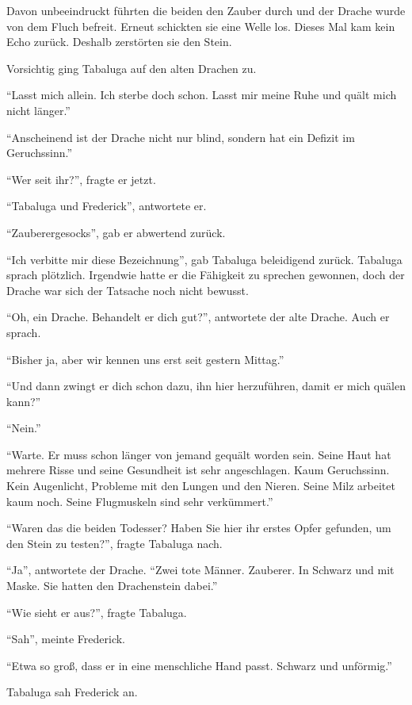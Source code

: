 Davon unbeeindruckt führten die beiden den Zauber durch und der Drache wurde von dem Fluch befreit. Erneut schickten sie eine Welle los. Dieses Mal kam kein Echo zurück. Deshalb zerstörten sie den Stein.

Vorsichtig ging Tabaluga auf den alten Drachen zu.

\enquote{Lasst mich allein. Ich sterbe doch schon. Lasst mir meine Ruhe und quält mich nicht länger.}

\enquote{Anscheinend ist der Drache nicht nur blind, sondern hat ein Defizit im Geruchssinn.}

\enquote{Wer seit ihr?}, fragte er jetzt.

\enquote{Tabaluga und Frederick}, antwortete er.

\enquote{Zauberergesocks}, gab er abwertend zurück.

\enquote{Ich verbitte mir diese Bezeichnung}, gab Tabaluga beleidigend zurück. Tabaluga sprach plötzlich. Irgendwie hatte er die Fähigkeit zu sprechen gewonnen, doch der Drache war sich der Tatsache noch nicht bewusst.

\enquote{Oh, ein Drache. Behandelt er dich gut?}, antwortete der alte Drache. Auch er sprach.

\enquote{Bisher ja, aber wir kennen uns erst seit gestern Mittag.}

\enquote{Und dann zwingt er dich schon dazu, ihn hier herzuführen, damit er mich quälen kann?}

\enquote{Nein.}

\enquote{Warte. Er muss schon länger von jemand gequält worden sein. Seine Haut hat mehrere Risse und seine Gesundheit ist sehr angeschlagen. Kaum Geruchssinn. Kein Augenlicht, Probleme mit den Lungen und den Nieren. Seine Milz arbeitet kaum noch. Seine Flugmuskeln sind sehr verkümmert.}

\enquote{Waren das die beiden Todesser? Haben Sie hier ihr erstes Opfer gefunden, um den Stein zu testen?}, fragte Tabaluga nach.

\enquote{Ja}, antwortete der Drache. \enquote{Zwei tote Männer. Zauberer. In Schwarz und mit Maske. Sie hatten den Drachenstein dabei.}

\enquote{Wie sieht er aus?}, fragte Tabaluga.

\enquote{Sah}, meinte Frederick.

\enquote{Etwa so groß, dass er in eine menschliche Hand passt. Schwarz und unförmig.}

Tabaluga sah Frederick an.

